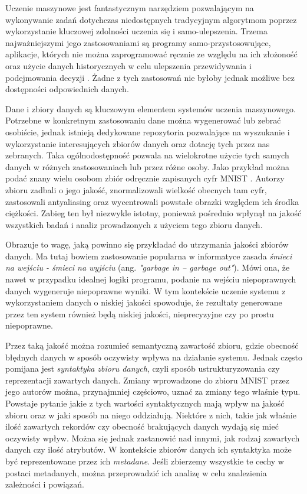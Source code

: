 Uczenie maszynowe jest fantastycznym narzędziem pozwalającym na wykonywanie zadań dotychczas niedostępnych tradycyjnym algorytmom poprzez wykorzystanie kluczowej zdolności uczenia się i samo-ulepszenia.
Trzema najważniejszymi jego zastosowaniami są programy samo-przystosowujące, aplikacje, których nie można zaprogramować ręcznie ze względu na ich złożoność oraz użycie danych historycznych w celu ulepszenia przewidywania i podejmowania decyzji \cite{mitchell1997machine}.
Żadne z tych zastosowań nie byłoby jednak możliwe bez dostępności odpowiednich danych.

Dane i zbiory danych są kluczowym elementem systemów uczenia maszynowego.
Potrzebne w konkretnym zastosowaniu dane można wygenerować lub zebrać osobiście, jednak istnieją dedykowane repozytoria pozwalające na wyszukanie i wykorzystanie interesujących zbiorów danych oraz dotację tych przez nas zebranych.
Taka ogólnodostępność pozwala na wielokrotne użycie tych samych danych w różnych zastosowaniach lub przez różne osoby.
Jako przykład można podać znany wielu osobom zbiór odręcznie zapisanych cyfr MNIST \cite{mnist}.
Autorzy zbioru zadbali o jego jakość, znormalizowali wielkość obecnych tam cyfr, zastosowali antyaliasing oraz wycentrowali powstałe obrazki względem ich środka ciężkości.
Zabieg ten był niezwykle istotny, ponieważ pośrednio wpłynął na jakość wszystkich badań i analiz prowadzonych z użyciem tego zbioru danych.

Obrazuje to wagę, jaką powinno się przykładać do utrzymania jakości zbiorów danych.
Ma tutaj bowiem zastosowanie popularna w informatyce zasada \textit{śmieci na wejściu - śmieci na wyjściu} (ang. \textit{"garbage in -- garbage out"}).
Mówi ona, że nawet w przypadku idealnej logiki programu, podanie na wejściu niepoprawnych danych wygeneruje niepoprawne wyniki.
W tym kontekście uczenie systemu z wykorzystaniem danych o niskiej jakości spowoduje, że rezultaty generowane przez ten system również będą niskiej jakości, nieprecyzyjne czy po prostu niepoprawne.

Przez taką jakość można rozumieć semantyczną zawartość zbioru, gdzie obecność błędnych danych w sposób oczywisty wpływa na działanie systemu.
Jednak często pomijana jest \textit{syntaktyka zbioru danych}, czyli sposób ustrukturyzowania czy reprezentacji zawartych danych.
Zmiany wprowadzone do zbioru MNIST przez jego autorów można, przynajmniej częściowo, uznać za zmiany tego właśnie typu.
Powstaje pytanie jakie z tych wartości syntaktycznych mają wpływ na jakość zbioru oraz w jaki sposób na niego oddziałują.
Niektóre z nich, takie jak właśnie ilość zawartych rekordów czy obecność brakujących danych wydają się mieć oczywisty wpływ.
Można się jednak zastanowić nad innymi, jak rodzaj zawartych danych czy ilość atrybutów.
W kontekście zbiorów danych ich syntaktyka może być reprezentowane przez ich \textit{metadane}.
Jeśli zbierzemy wszystkie te cechy w postaci metadanych, można przeprowadzić ich analizę w celu znalezienia zależności i powiązań.

